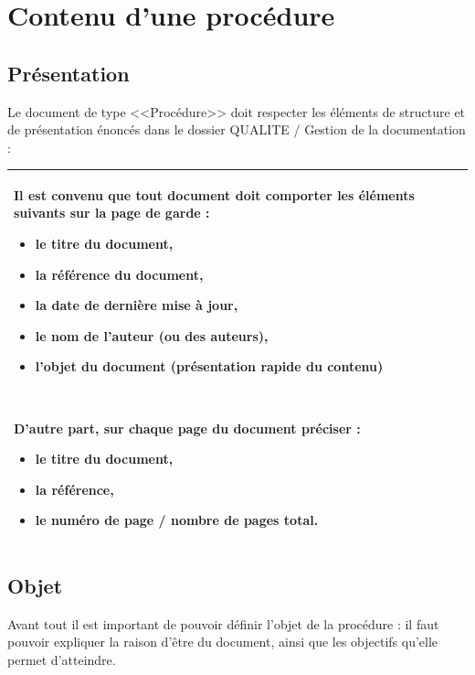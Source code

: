 \documentclass{mise_en_page}
\begin{document}
\section[Contenu d’une procédure]{Contenu d’une procédure}
\subsection[Présentation]{Présentation}

Le document de type {\textless}{\textless}Procédure{\textgreater}{\textgreater} doit respecter les éléments de structure et de présentation énoncés dans le dossier QUALITE / Gestion de la documentation :

\begin{flushleft}
\tablehead{}
\begin{supertabular}{|m{16.345cm}|}
\hline
Il est convenu que tout document doit comporter les éléments suivants
sur la page de garde :

\begin{itemize}
\item le titre du document,\item la référence du document,\item la date
de dernière mise à jour,\item le nom de l’auteur (ou des auteurs),\item
l’objet du document (présentation rapide du contenu)\end{itemize}
~

D’autre part, sur chaque page du document préciser :

\begin{itemize}
\item le titre du document,\item la référence,\item le numéro de page /
nombre de pages total.\end{itemize}
\\\hline
\end{supertabular}
\end{flushleft}

\subsection[Objet]{Objet}

Avant tout il est important de pouvoir définir l’objet de la procédure :
il faut pouvoir expliquer la raison d’être du document, ainsi que les
objectifs qu’elle permet d’atteindre.
\end{document}
